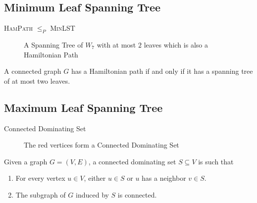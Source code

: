 \documentclass{beamer}
\begin{document}
\subsection{Minimum Leaf Spanning Tree}

\begin{frame}{\textsc{HamPath} $\leq_{P}$ \textsc{MinLST}}
\begin{figure}
  \vspace{0.3 cm}

  \caption{\small A Spanning Tree of $W_7$ with at most $2$ leaves which is also a Hamiltonian Path}
\end{figure} \pause 
\begin{lemma}
    A connected graph $G$ has a Hamiltonian path if and only if it has a spanning tree of at most two leaves. 
\end{lemma}
\end{frame}

\subsection{Maximum Leaf Spanning Tree}


\begin{frame}{Connected Dominating Set}

\begin{figure}
  \caption{The red vertices form a Connected Dominating Set}
\end{figure}
\pause
\begin{definition}
 Given a graph $G=(V, E)$, a connected dominating set $S \subseteq V$ is such that
 \begin{enumerate}
  \item For every vertex $u \in V$, either $u \in S$ or $u$ has a neighbor $v \in S$.
  \item The subgraph of $G$ induced by $S$ is connected.
 \end{enumerate}
\end{definition}


\end{frame}
\end{document}
